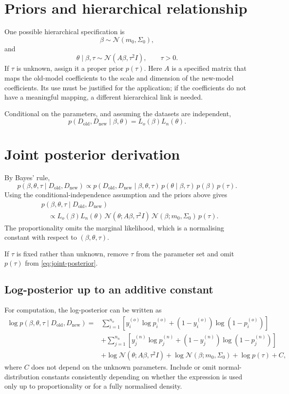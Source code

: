 \documentclass[11pt,a4paper]{article}
\begin{document}
\section{Priors and hierarchical relationship}

One possible hierarchical specification is
\[
\beta\sim\mathcal N(m_0,\Sigma_0),
\]
and
\[
\theta\mid\beta,\tau\sim\mathcal N(A\beta,\tau^2 I),
\qquad \tau>0.
\]
If $\tau$ is unknown, assign it a proper prior $p(\tau)$. Here $A$ is a specified matrix that maps the old-model coefficients to the scale and dimension of the new-model coefficients. Its use must be justified for the application; if the coefficients do not have a meaningful mapping, a different hierarchical link is needed.

Conditional on the parameters, and assuming the datasets are independent,
\[
p(D_{\mathrm{old}},D_{\mathrm{new}}\mid\beta,\theta)
=L_o(\beta)L_n(\theta).
\]

\section{Joint posterior derivation}

By Bayes' rule,
\[
p(\beta,\theta,\tau\mid D_{\mathrm{old}},D_{\mathrm{new}})
\propto
p(D_{\mathrm{old}},D_{\mathrm{new}}\mid\beta,\theta,\tau)
\,p(\theta\mid\beta,\tau)\,p(\beta)\,p(\tau).
\]
Using the conditional-independence assumption and the priors above gives
\begin{align}
&p(\beta,\theta,\tau\mid D_{\mathrm{old}},D_{\mathrm{new}})\\
&\quad\propto
L_o(\beta)L_n(\theta)\,
\mathcal N(\theta;A\beta,\tau^2 I)\,
\mathcal N(\beta;m_0,\Sigma_0)\,
p(\tau).
\label{eq:joint-posterior}
\end{align}
The proportionality omits the marginal likelihood, which is a normalising constant with respect to $(\beta,\theta,\tau)$.

If $\tau$ is fixed rather than unknown, remove $\tau$ from the parameter set and omit $p(\tau)$ from \eqref{eq:joint-posterior}.

\subsection{Log-posterior up to an additive constant}

For computation, the log-posterior can be written as
\begin{align}
\log p(\beta,\theta,\tau\mid D_{\mathrm{old}},D_{\mathrm{new}})
={}&
\sum_{i=1}^{n_o}\left[
y_i^{(o)}\log p_i^{(o)}
+(1-y_i^{(o)})\log(1-p_i^{(o)})
\right]\\
&+\sum_{j=1}^{n_n}\left[
y_j^{(n)}\log p_j^{(n)}
+(1-y_j^{(n)})\log(1-p_j^{(n)})
\right]\\
&+\log\mathcal N(\theta;A\beta,\tau^2I)
+\log\mathcal N(\beta;m_0,\Sigma_0)
+\log p(\tau)+C,
\end{align}
where $C$ does not depend on the unknown parameters. Include or omit normal-distribution constants consistently depending on whether the expression is used only up to proportionality or for a fully normalised density.
\end{document}
